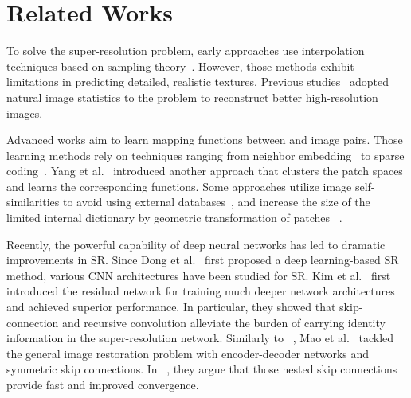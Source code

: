 \documentclass[10pt,twocolumn,letterpaper]{article}
\begin{document}
	
	\section{Related Works}
	
	To solve the super-resolution problem, early approaches use interpolation techniques based on sampling theory~\cite{allebach1996edge, li2001new, zhang2006edge}. However, those methods exhibit limitations in predicting detailed, realistic textures.
	Previous studies~\cite{tai2010super, sun2008image} adopted natural image statistics to the problem to reconstruct better high-resolution images.
	
	Advanced works aim to learn mapping functions between  and   image pairs.
	Those learning methods rely on techniques ranging from neighbor embedding~\cite{chang2004super, bevilacqua2012low, gao2012image, roweis2000nonlinear}  to sparse coding~\cite{yang2012coupled, yang2010image, timofte2014a+, zeyde2010single}.
	Yang et al.~\cite{yang2013fast} introduced another approach that clusters the patch spaces and learns the corresponding functions.
	Some approaches utilize image self-similarities to avoid using external databases~\cite{glasner2009super, freedman2011image, wang2015learning}, and
	increase the size of the limited internal dictionary by geometric transformation of patches  ~\cite{huang2015single}.
	
	Recently, the powerful capability of deep neural networks has led to dramatic improvements in SR.
	Since Dong et al.~\cite{dong2014learning, dong2016accelerating} first proposed a deep learning-based SR method, various CNN architectures have been studied for SR.
	Kim et al.~\cite{kim2016accurate, kim2016deeply} first introduced the residual network for training much deeper network architectures and achieved superior performance. In particular, they showed that skip-connection and recursive convolution alleviate the burden of carrying identity information in the super-resolution network.
	Similarly to ~\cite{ronneberger2015u}, Mao et al.~\cite{mao2016image} tackled the general image restoration problem with encoder-decoder networks and symmetric skip connections. In ~\cite{mao2016image}, they argue that those nested skip connections provide fast and improved convergence.
	
\end{document}
